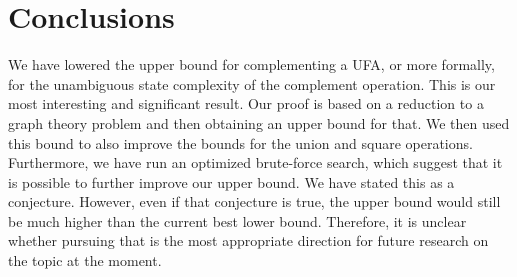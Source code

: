 \documentclass{report}
\theoremstyle{definition}
\begin{document}
\chapter{Conclusions}

We have lowered the upper bound for complementing a UFA, or more formally,
for the unambiguous state complexity of the complement operation.
This is our most interesting and significant result.
Our proof is based on a reduction to a graph theory problem and then
obtaining an upper bound for that. We then used this bound to also improve
the bounds for the union and square operations. Furthermore, we have run
an optimized brute-force search, which suggest that it is possible to further improve
our upper bound. We have stated this as a conjecture. However, even if that
conjecture is true, the upper bound would still be much higher than the current best
lower bound. Therefore, it is unclear whether pursuing that is the most appropriate
direction for future research on the topic at the moment.



\end{document}
